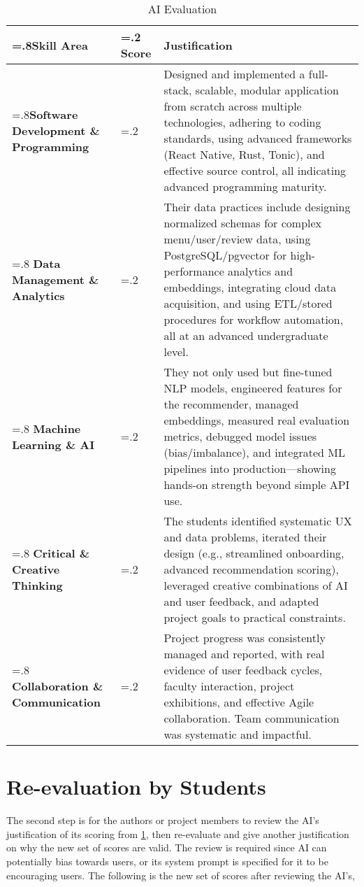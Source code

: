 \begin{table}[ht!]
    \centering
    \small\begin{tabularx}{\textwidth}{| >{\hsize=.8\hsize}X | >{\hsize=.2\hsize}X | >{\hsize=2.0\hsize}X |}
        \hline
        \textbf{Skill Area} & \textbf{Score} & \textbf{Justification} \\\hline
        \textbf{Software Development \& Programming} & 3 & Designed and implemented a full-stack, scalable, modular application from scratch across multiple technologies, adhering to coding standards, using advanced frameworks (React Native, Rust, Tonic), and effective source control, all indicating advanced programming maturity. \\ \hline
        \textbf{Data Management \& Analytics} & 3 & Their data practices include designing normalized schemas for complex menu/user/review data, using PostgreSQL/pgvector for high-performance analytics and embeddings, integrating cloud data acquisition, and using ETL/stored procedures for workflow automation, all at an advanced undergraduate level. \\ \hline
        \textbf{Machine Learning \& AI} & 3 & They not only used but fine-tuned NLP models, engineered features for the recommender, managed embeddings, measured real evaluation metrics, debugged model issues (bias/imbalance), and integrated ML pipelines into production—showing hands-on strength beyond simple API use. \\ \hline
        \textbf{Critical \& Creative Thinking} & 3 & The students identified systematic UX and data problems, iterated their design (e.g., streamlined onboarding, advanced recommendation scoring), leveraged creative combinations of AI and user feedback, and adapted project goals to practical constraints. \\ \hline
        \textbf{Collaboration \& Communication} & 3 & Project progress was consistently managed and reported, with real evidence of user feedback cycles, faculty interaction, project exhibitions, and effective Agile collaboration. Team communication was systematic and impactful. \\ \hline
    \end{tabularx}
    \caption{AI Evaluation}
    \label{table:ai-evaluation}
\end{table}

\section{Re-evaluation by Students}
\label{section:reevaluation}
The second step is for the authors or project members to review the AI's justification of its scoring from \ref{table:ai-evaluation}, then re-evaluate and give another justification
on why the new set of scores are valid. The review is required since AI can potentially bias towards users, or its system prompt is specified
for it to be encouraging users. The following is the new set of scores after reviewing the AI's,

